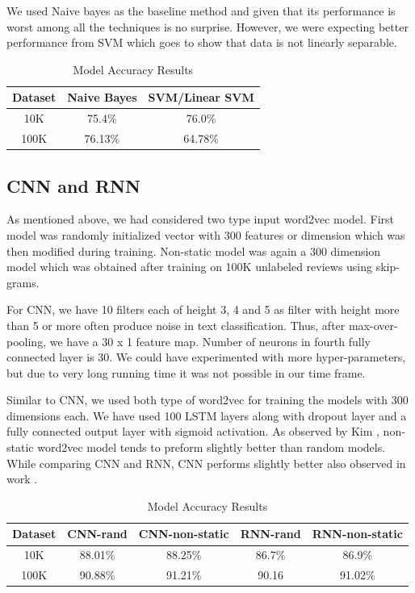 \documentclass[11pt]{article}
\begin{document}
		We used Naive bayes as the baseline method and given that its performance is worst among all the techniques is no surprise. However, we were expecting better performance from SVM which goes to show that data is not linearly separable.
		\begin{table}
		\caption{Model Accuracy Results} 
		\begin{center}
			\begin{tabular}{|c|c|c|}
				
				\hline
				Dataset & Naive Bayes & SVM/Linear SVM \\
				\hline
				\hline
				10K & 75.4\%  & 76.0\% \\
				\hline
				100K & 76.13\% & 64.78\% \\
				\hline
			\end{tabular}
			 
		\end{center}
		\end{table}
		\subsection{CNN and RNN}
		As mentioned above, we had considered two type input word2vec model. First model was randomly initialized vector with 300 features or dimension which was then modified during training. Non-static model was again a 300 dimension model which was obtained after training on 100K unlabeled reviews using skip-grams. 
		
		For CNN, we have 10 filters each of height 3, 4 and 5 as filter with height more than 5 or more often produce noise in text classification. Thus, after max-over-pooling, we have a 30 x 1 feature map. Number of neurons in fourth fully connected layer is 30. We could have experimented with more hyper-parameters, but due to very long running time it was not possible in our time frame.
		
		Similar to CNN, we used both type of word2vec for training the models with 300 dimensions each. We have used 100 LSTM layers along with dropout layer and a fully connected output layer with sigmoid activation. As observed by Kim \cite{kim}, non-static word2vec model tends to preform slightly better than random models. While comparing CNN and RNN, CNN performs slightly better also observed in work \cite{ydlb}. 
		
			\begin{table}
				\caption{Model Accuracy Results} 
				\begin{center}
					\begin{tabular}{|c|c|c|c|c|}
						
						\hline
						Dataset & CNN-rand & CNN-non-static & RNN-rand & RNN-non-static \\
						\hline
						\hline
						10K & 88.01\%  & 88.25\% &  86.7\% & 86.9\%\\
						\hline
						100K & 90.88\% & 91.21\% & 90.16 & 91.02\% \\
						\hline
					\end{tabular}
					
				\end{center}
			\end{table}
		    	
\end{document}
